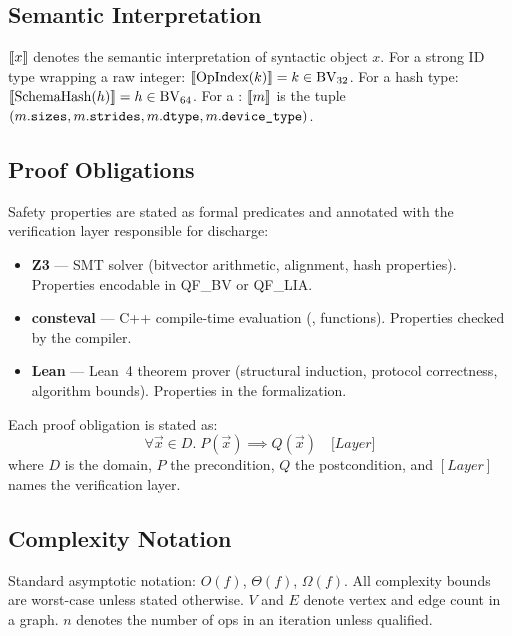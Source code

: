 \subsection{Semantic Interpretation}

$\llbracket x \rrbracket$ denotes the semantic interpretation of syntactic object $x$.
For a strong ID type wrapping a raw integer:
$\llbracket \text{OpIndex}(k) \rrbracket = k \in \mathrm{BV}_{32}$.
For a hash type: $\llbracket \text{SchemaHash}(h) \rrbracket = h \in \mathrm{BV}_{64}$.
For a : $\llbracket m \rrbracket$ is the tuple
$(m.\texttt{sizes}, m.\texttt{strides}, m.\texttt{dtype}, m.\texttt{device\_type})$.

\subsection{Proof Obligations}
\label{sec:proofobligation-format}

Safety properties are stated as formal predicates and annotated with
the verification layer responsible for discharge:

\begin{itemize}
  \item \textbf{Z3} --- SMT solver (bitvector arithmetic, alignment, hash properties).
    Properties encodable in QF\_BV or QF\_LIA.
  \item \textbf{consteval} --- C++ compile-time evaluation (,
     functions). Properties checked by the compiler.
  \item \textbf{Lean} --- Lean~4 theorem prover (structural induction,
    protocol correctness, algorithm bounds). Properties in the
     formalization.
\end{itemize}

\begin{proofobligation}[Format]
Each proof obligation is stated as:
\[
  \forall \vec{x} \in D.\; P(\vec{x}) \implies Q(\vec{x})
  \quad \bigl[\textit{Layer}\bigr]
\]
where $D$ is the domain, $P$ the precondition, $Q$ the postcondition,
and $[\textit{Layer}]$ names the verification layer.
\end{proofobligation}

\subsection{Complexity Notation}

Standard asymptotic notation: $O(f)$, $\Theta(f)$, $\Omega(f)$.
All complexity bounds are worst-case unless stated otherwise.
$V$ and $E$ denote vertex and edge count in a graph.
$n$ denotes the number of ops in an iteration unless qualified.

